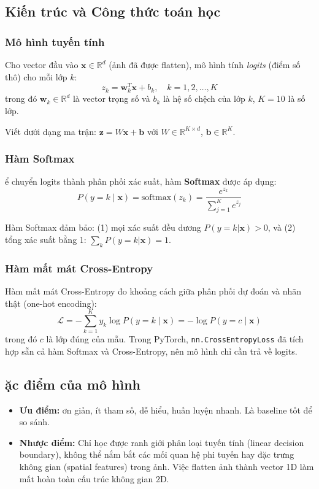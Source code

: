 \documentclass[a4paper]{article}
\newcommand{\code}[1]{\texttt{\textcolor{blue!80!black}{#1}}}
\theoremstyle{definition}
\begin{document}
\subsection{Kiến trúc và Công thức toán học}

\subsubsection{Mô hình tuyến tính}
Cho vector đầu vào $\mathbf{x} \in \mathbb{R}^d$ (ảnh đã được flatten), mô hình tính \textit{logits} (điểm số thô) cho mỗi lớp $k$:
\begin{equation}
	z_k = \mathbf{w}_k^T \mathbf{x} + b_k, \quad k = 1, 2, \ldots, K
	\label{eq:softmax-logits}
\end{equation}
trong đó $\mathbf{w}_k \in \mathbb{R}^d$ là vector trọng số và $b_k$ là hệ số chệch của lớp $k$, $K=10$ là số lớp.

Viết dưới dạng ma trận: $\mathbf{z} = W\mathbf{x} + \mathbf{b}$ với $W \in \mathbb{R}^{K \times d}$, $\mathbf{b} \in \mathbb{R}^K$.

\subsubsection{Hàm Softmax}
\DJ ể chuyển logits thành phân phối xác suất, hàm \textbf{Softmax} được áp dụng:
\begin{equation}
	P(y = k \mid \mathbf{x}) = \text{softmax}(z_k) = \frac{e^{z_k}}{\sum_{j=1}^{K} e^{z_j}}
	\label{eq:softmax-func}
\end{equation}

Hàm Softmax đảm bảo: (1) mọi xác suất đều dương $P(y=k|\mathbf{x}) > 0$, và (2) tổng xác suất bằng 1: $\sum_k P(y=k|\mathbf{x}) = 1$.

\subsubsection{Hàm mất mát Cross-Entropy}
Hàm mất mát Cross-Entropy đo khoảng cách giữa phân phối dự đoán và nhãn thật (one-hot encoding):
\begin{equation}
	\mathcal{L} = -\sum_{k=1}^{K} y_k \log P(y = k \mid \mathbf{x}) = -\log P(y = c \mid \mathbf{x})
	\label{eq:cross-entropy}
\end{equation}
trong đó $c$ là lớp đúng của mẫu. Trong PyTorch, \code{nn.CrossEntropyLoss} đã tích hợp sẵn cả hàm Softmax và Cross-Entropy, nên mô hình chỉ cần trả về logits.

\subsection{\DJ ặc điểm của mô hình}
\begin{itemize}
	\item \textbf{Ưu điểm:} \DJ ơn giản, ít tham số, dễ hiểu, huấn luyện nhanh. Là baseline tốt để so sánh.
	\item \textbf{Nhược điểm:} Chỉ học được ranh giới phân loại tuyến tính (linear decision boundary), không thể nắm bắt các mối quan hệ phi tuyến hay đặc trưng không gian (spatial features) trong ảnh. Việc flatten ảnh thành vector 1D làm mất hoàn toàn cấu trúc không gian 2D.
\end{itemize}
\end{document}
